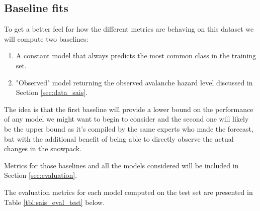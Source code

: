 \documentclass{article}
\begin{document}
\subsection{Baseline fits}

To get a better feel for how the different metrics are behaving on this dataset we will compute two baselines: 
\begin{enumerate}
	\item A constant model that always predicts the most common class in the training set.
	\item "Observed" model returning the observed avalanche hazard level discussed in Section \ref{sec:data_sais}.
\end{enumerate}
The idea is that the first baseline will provide a lower bound on the performance of any model we might want to begin to consider and the second one will likely be the upper bound as it's compiled by the same experts who made the forecast, but with the additional benefit of being able to directly observe the actual changes in the snowpack.

Metrics for those baselines and all the models considered will be included in Section \ref{sec:evaluation}.

	The evaluation metrics for each model computed on the test set are presented in Table \ref{tbl:sais_eval_test} below. 


	
\end{document}
